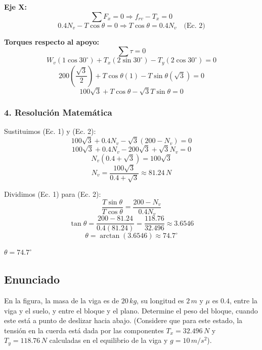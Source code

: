 \documentclass[12pt, a4paper]{article}
\begin{document}
\textbf{Eje X:}
$$\sum F_x = 0 \Rightarrow f_{rv} - T_x = 0$$
$$0.4 N_v - T \cos\theta = 0 \Rightarrow T \cos\theta = 0.4 N_v \quad \text{(Ec. 2)}$$

\textbf{Torques respecto al apoyo:}
$$\sum \tau = 0$$
$$W_v (1 \cos 30^\circ) + T_x (2 \sin 30^\circ) - T_y (2 \cos 30^\circ) = 0$$
$$200 \left( \frac{\sqrt{3}}{2} \right) + T \cos\theta (1) - T \sin\theta (\sqrt{3}) = 0$$
$$100\sqrt{3} + T \cos\theta - \sqrt{3} T \sin\theta = 0$$

\subsubsection*{4. Resolución Matemática}
Sustituimos (Ec. 1) y (Ec. 2):
$$100\sqrt{3} + 0.4 N_v - \sqrt{3} (200 - N_v) = 0$$
$$100\sqrt{3} + 0.4 N_v - 200\sqrt{3} + \sqrt{3} N_v = 0$$
$$N_v (0.4 + \sqrt{3}) = 100\sqrt{3}$$
$$N_v = \frac{100\sqrt{3}}{0.4 + \sqrt{3}} \approx 81.24 \, \si{N}$$

Dividimos (Ec. 1) para (Ec. 2):
$$\frac{T \sin\theta}{T \cos\theta} = \frac{200 - N_v}{0.4 N_v}$$
$$\tan\theta = \frac{200 - 81.24}{0.4(81.24)} = \frac{118.76}{32.496} \approx 3.6546$$
$$\theta = \arctan(3.6546) \approx 74.7^\circ$$

\begin{tcolorbox}[colback=green!5!white, colframe=green!50!black, title=Respuesta Final]
\centering \Large $\theta = 74.7^\circ$
\end{tcolorbox}

\newpage

\subsection*{Enunciado}
En la figura, la masa de la viga es de $20 \, \si{kg}$, su longitud es $2 \, \si{m}$ y $\mu$ es $0.4$, entre la viga y el suelo, y entre el bloque y el plano. Determine el peso del bloque, cuando este está a punto de deslizar hacia abajo. (Considere que para este estado, la tensión en la cuerda está dada por las componentes $T_x = 32.496 \, \si{N}$ y $T_y = 118.76 \, \si{N}$ calculadas en el equilibrio de la viga y $g=10\,\si{m/s^2}$).
\end{document}
